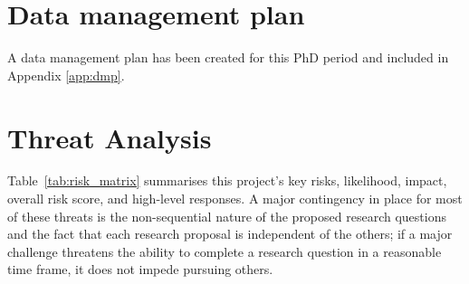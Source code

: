 \documentclass[10pt,oneside]{book}
\begin{document}
\section{Data management plan}

A data management plan has been created for this PhD period and included in Appendix \ref{app:dmp}.


\section{Threat Analysis}

Table~\ref{tab:risk_matrix} summarises this project's key risks, likelihood, impact, overall risk score, and high-level responses. A major contingency in place for most of these threats is the non-sequential nature of the proposed research questions and the fact that each research proposal is independent of the others; if a major challenge threatens the ability to complete a research question in a reasonable time frame, it does not impede pursuing others.  
\end{document}
